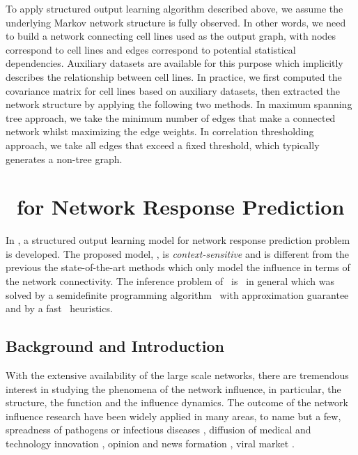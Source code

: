 {%
To apply structured output learning algorithm described above, we assume the underlying Markov network structure is fully observed.
In other words, we need to build a network connecting cell lines used as the output graph, with nodes correspond to cell lines and edges correspond to potential statistical dependencies.
Auxiliary datasets are available for this purpose \citep{Shoemaker06the}  which implicitly describes the relationship between cell lines.
In practice, we first computed the covariance matrix for cell lines based on auxiliary datasets, then extracted the network structure by applying the following two methods.
In maximum spanning tree approach, we take the minimum number of edges that make a connected network whilst maximizing the edge weights.
In correlation thresholding approach, we take all edges that exceed a fixed threshold, which typically generates a non-tree graph.


%
%
\section{\spin\ for Network Response Prediction}\label{sc_su14b}

In , a structured output learning model for network response prediction problem is developed.
The proposed model, \spin, is \textit{context-sensitive} and is different from the previous the state-of-the-art methods which only model the influence in terms of the network connectivity.
The inference problem of \spin\ is \nphard\ in general which was solved by a semidefinite programming algorithm \sdp\ with approximation guarantee and by a fast \greedy\ heuristics.

\subsection{Background and Introduction}

With the extensive availability of the large scale networks, there are tremendous interest in studying the phenomena of the network influence, in particular, the structure, the function and the influence dynamics. 
The outcome of the network influence research have been widely applied in many areas, to name but a few, spreadness of pathogens or infectious diseases \citep{Hethcote00the,Anderson02infectious}, diffusion of medical and technology innovation \citep{Strang98diffusion,Rogers03the}, opinion and news formation \citep{Adar04implicit,Gruhl04information,Adar05tracking,Leskovec07cascading,Nowell08tracing,Leskovec09meme}, viral market \citep{Domingos01mining,Kempe03maximizing,Liben-Nowell03the}.

}
